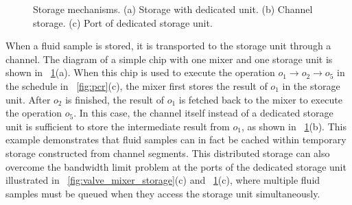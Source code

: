 \begin{figure}[t]
{\figurefontsize
\centering

\caption{Storage mechanisms. (a) Storage with dedicated unit. (b) Channel
storage. (c) Port of dedicated storage unit.}
\label{fig:device_storage}
}
\end{figure}

When a fluid sample is stored, it is transported to the storage unit through a
channel. The diagram of a simple chip with one mixer and one storage unit is
shown in \figname~\ref{fig:device_storage}(a). When this chip is used to execute
the operation $o_1\to o_2\to o_5$ in the schedule in
\figname~\ref{fig:pcr}(c), the mixer first stores the result of $o_1$ in the
storage unit. After $o_2$ is finished, the result of $o_1$ is fetched back to
the mixer to execute the operation $o_5$.
%
In this case, %
the channel itself instead of a dedicated
storage unit is sufficient to store the intermediate result from $o_1$,
 as shown in \figname~\ref{fig:device_storage}(b).
This example demonstrates that
fluid samples can in fact be cached %
within temporary
storage constructed from channel segments. This distributed storage can also
overcome the bandwidth limit problem at the ports of the dedicated storage unit
illustrated in \figname~\ref{fig:valve_mixer_storage}(c)
and \figname~\ref{fig:device_storage}(c),
where multiple fluid samples must be queued when they access the storage unit
simultaneously.


